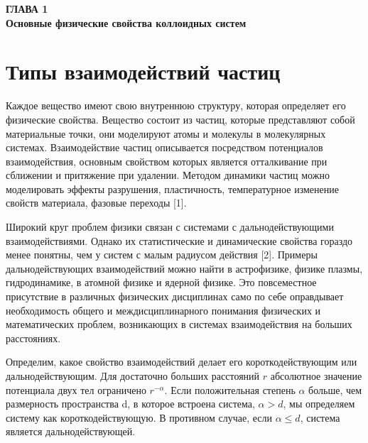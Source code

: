 
\newpage
\begin{center}
\textbf{ГЛАВА 1}\\
\textbf{Основные физические свойства коллоидных систем}
\end{center}




\section{Типы взаимодействий частиц}\label{C1_1}
Каждое вещество имеют свою внутреннюю структуру, которая определяет его физические свойства. Вещество состоит из частиц, которые представляют собой материальные точки, они моделируют атомы и молекулы в молекулярных системах. Взаимодействие частиц описывается посредством потенциалов взаимодействия, основным свойством которых является отталкивание при сближении и притяжение при удалении. Методом динамики частиц можно моделировать эффекты разрушения, пластичность, температурное изменение свойств материала, фазовые переходы [1].

Широкий круг проблем физики связан с системами с дальнодействующими взаимодействиями. Однако их статистические и динамические свойства гораздо менее понятны, чем у систем с малым радиусом действия [2]. Примеры дальнодействующих взаимодействий можно найти в астрофизике, физике плазмы, гидродинамике, в атомной физике и ядерной физике. Это повсеместное присутствие в различных физических дисциплинах само по себе оправдывает необходимость общего и междисциплинарного понимания физических и математических проблем, возникающих в системах взаимодействия на больших расстояниях. 

Определим, какое свойство взаимодействий делает его короткодействующим или дальнодействующим. Для достаточно больших расстояний $r$ абсолютное значение потенциала двух тел ограничено $r^{-\alpha}$. Если положительная степень $\alpha$ больше, чем размерность пространства d, в которое встроена система, $\alpha>d$, мы определяем систему как короткодействующую. В противном случае, если $\alpha \leq d$, система является дальнодействующей.

